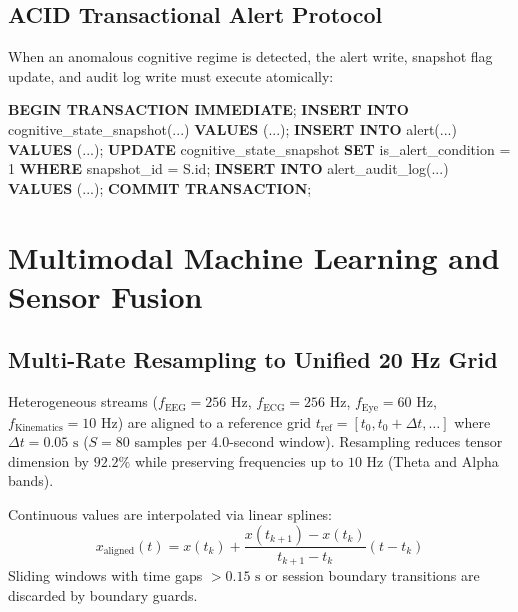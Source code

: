\documentclass[journal]{IEEEtran}
\begin{document}
\subsection{ACID Transactional Alert Protocol}
When an anomalous cognitive regime is detected, the alert write, snapshot flag update, and audit log write must execute atomically:
\begin{algorithm}[H]
\caption{Atomic Safety-Critical Alert Dispatch}
\begin{algorithmic}[1]
\STATE \textbf{BEGIN TRANSACTION IMMEDIATE};
\STATE \textbf{INSERT INTO} cognitive\_state\_snapshot(...) \textbf{VALUES} (...);
    \STATE \textbf{INSERT INTO} alert(...) \textbf{VALUES} (...);
    \STATE \textbf{UPDATE} cognitive\_state\_snapshot \textbf{SET} is\_alert\_condition = 1 \textbf{WHERE} snapshot\_id = S.id;
    \STATE \textbf{INSERT INTO} alert\_audit\_log(...) \textbf{VALUES} (...);
\ENDIF
\STATE \textbf{COMMIT TRANSACTION};
\end{algorithmic}
\end{algorithm}

\section{Multimodal Machine Learning and Sensor Fusion}

\subsection{Multi-Rate Resampling to Unified 20 Hz Grid}
Heterogeneous streams ($f_{\text{EEG}} = 256\text{ Hz}$, $f_{\text{ECG}} = 256\text{ Hz}$, $f_{\text{Eye}} = 60\text{ Hz}$, $f_{\text{Kinematics}} = 10\text{ Hz}$) are aligned to a reference grid $t_{\text{ref}} = [t_0, t_0 + \Delta t, \dots]$ where $\Delta t = 0.05\text{ s}$ ($S=80$ samples per 4.0-second window). Resampling reduces tensor dimension by $92.2\%$ while preserving frequencies up to $10\text{ Hz}$ (Theta and Alpha bands).

Continuous values are interpolated via linear splines:
\begin{equation}
    x_{\text{aligned}}(t) = x(t_k) + \frac{x(t_{k+1}) - x(t_k)}{t_{k+1} - t_k}(t - t_k)
\end{equation}
Sliding windows with time gaps $> 0.15\text{ s}$ or session boundary transitions are discarded by boundary guards.
\end{document}
